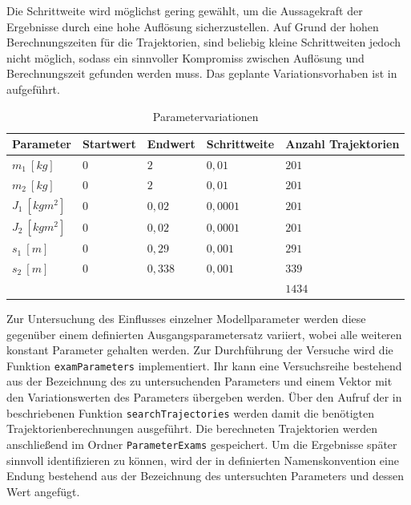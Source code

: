 Die Schrittweite wird möglichst gering gewählt, um die Aussagekraft der Ergebnisse durch eine hohe Auflösung sicherzustellen. Auf Grund der hohen Berechnungszeiten für die Trajektorien, sind beliebig kleine Schrittweiten jedoch nicht möglich, sodass ein sinnvoller Kompromiss zwischen Auflösung und Berechnungszeit gefunden werden muss. Das geplante Variationsvorhaben ist in  aufgeführt.
\begin{table}[h]
	\centering
		\begin{tabular}{lllll}
			Parameter & Startwert & Endwert & Schrittweite & Anzahl Trajektorien \\
			\midrule
			$m_1 \ [\unit{kg}]$     & $0$ & $2$    & $0,01$   & $201$ \\
			$m_2 \ [\unit{kg}]$     & $0$ & $2$    & $0,01$   & $201$ \\
			$J_1 \ [\unit{kgm^2}]$  & $0$ & $0,02$ & $0,0001$ & $201$ \\
			$J_2 \ [\unit{kgm^2}]$  & $0$ & $0,02$ & $0,0001$ & $201$ \\
		  $s_1 \ [\unit{m}]$      & $0$ & $0,29$ & $0,001$  & $291$ \\
			$s_2 \ [\unit{m}]$      & $0$ & $0,338$& $0,001$  & $339$ \\

			\midrule
			                        &     &        &          & $1434$ \
			
		\end{tabular}
	\caption{Parametervariationen}
	\label{tab:Parametervariationen}
\end{table}

Zur Untersuchung des Einflusses einzelner Modellparameter werden diese gegenüber einem definierten Ausgangsparametersatz variiert, wobei alle weiteren konstant Parameter gehalten werden. Zur Durchführung der Versuche wird die Funktion \texttt{examParameters} implementiert. Ihr kann eine Versuchsreihe bestehend aus der Bezeichnung des zu untersuchenden Parameters und einem Vektor mit den Variationswerten des Parameters übergeben werden. Über den Aufruf der in  beschriebenen Funktion \texttt{searchTrajectories} werden damit die benötigten Trajektorienberechnungen ausgeführt. Die berechneten Trajektorien werden anschließend im Ordner \texttt{ParameterExams} gespeichert. Um die Ergebnisse später sinnvoll identifizieren zu können, wird der in  definierten Namenskonvention eine Endung bestehend aus der Bezeichnung des untersuchten Parameters und dessen Wert angefügt. 

